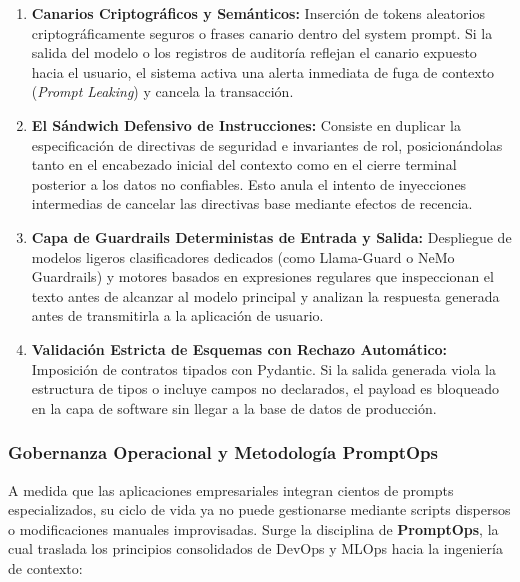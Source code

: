 \begin{enumerate}
    \item \textbf{Canarios Criptográficos y Semánticos:} Inserción de tokens aleatorios criptográficamente seguros o frases canario dentro del system prompt. Si la salida del modelo o los registros de auditoría reflejan el canario expuesto hacia el usuario, el sistema activa una alerta inmediata de fuga de contexto (\textit{Prompt Leaking}) y cancela la transacción.
    \item \textbf{El Sándwich Defensivo de Instrucciones:} Consiste en duplicar la especificación de directivas de seguridad e invariantes de rol, posicionándolas tanto en el encabezado inicial del contexto como en el cierre terminal posterior a los datos no confiables. Esto anula el intento de inyecciones intermedias de cancelar las directivas base mediante efectos de recencia.
    \item \textbf{Capa de Guardrails Deterministas de Entrada y Salida:} Despliegue de modelos ligeros clasificadores dedicados (como Llama-Guard o NeMo Guardrails) y motores basados en expresiones regulares que inspeccionan el texto antes de alcanzar al modelo principal y analizan la respuesta generada antes de transmitirla a la aplicación de usuario.
    \item \textbf{Validación Estricta de Esquemas con Rechazo Automático:} Imposición de contratos tipados con Pydantic. Si la salida generada viola la estructura de tipos o incluye campos no declarados, el payload es bloqueado en la capa de software sin llegar a la base de datos de producción.
\end{enumerate}

\subsubsection{Gobernanza Operacional y Metodología PromptOps}

A medida que las aplicaciones empresariales integran cientos de prompts especializados, su ciclo de vida ya no puede gestionarse mediante scripts dispersos o modificaciones manuales improvisadas. Surge la disciplina de \textbf{PromptOps}, la cual traslada los principios consolidados de DevOps y MLOps hacia la ingeniería de contexto:

